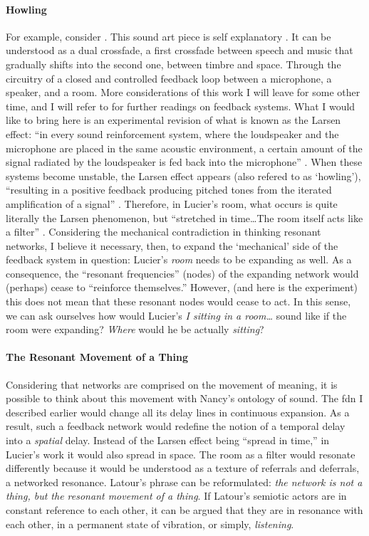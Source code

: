 \paragraph{Howling}
For example, consider  . This sound art piece is self explanatory . It can be understood as a dual crossfade, a first crossfade between speech and music that gradually shifts into the second one, between timbre and space. Through the circuitry of a closed and controlled feedback loop between a microphone, a speaker, and a room. More considerations of this work I will leave for some other time, and I will refer to \textcite{icmc/bbp2372.2012.006} for further readings on feedback systems. What I would like to bring here is an experimental revision of what is known as the Larsen effect: ``in every sound reinforcement system, where the loudspeaker and the microphone are placed in the same acoustic environment, a certain amount of the signal radiated by the loudspeaker is fed back into the microphone'' \parencite[11]{Kro11:Aco}. When these systems become unstable, the Larsen effect appears (also refered to as `howling'), ``resulting in a positive feedback producing pitched tones from the iterated amplification of a signal'' \parencite[31]{icmc/bbp2372.2012.006}. Therefore, in Lucier's room, what occurs is quite literally the Larsen phenomenon, but ``stretched in time\dots The room itself acts like a filter'' \parencite[34]{icmc/bbp2372.2012.006}. Considering the mechanical contradiction in thinking resonant networks, I believe it necessary, then, to expand the `mechanical' side of the feedback system in question: Lucier's \textit{room} needs to be expanding as well. As a consequence, the ``resonant frequencies'' (nodes) of the expanding network would (perhaps) cease to ``reinforce themselves.'' However, (and here is the experiment) this does not mean that these resonant nodes would cease to act. In this sense, we can ask ourselves how would Lucier's \textit{I sitting in a room\dots} sound like if the room were expanding? \textit{Where} would he be actually \textit{sitting}?

\paragraph{The Resonant Movement of a Thing}
Considering that networks are comprised on the movement of meaning, it is possible to think about this movement with Nancy's ontology of sound. The \gls{fdn} I described earlier would change all its delay lines in continuous expansion. As a result, such a feedback network would redefine the notion of a temporal delay into a \textit{spatial} delay. Instead of the Larsen effect being ``spread in time,'' in Lucier's work it would also spread in space. The room as a filter would resonate differently because it would be understood as a texture of referrals and deferrals, a networked resonance. Latour's phrase can be reformulated: \textit{the network is not a thing, but the resonant movement of a thing}. If Latour's semiotic actors are in constant reference to each other, it can be argued that they are in resonance with each other, in a permanent state of vibration, or simply, \textit{listening}.

